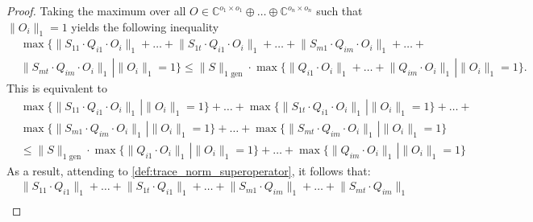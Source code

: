 \begin{proof}
Taking the maximum over all $O \in \mathbb{C}^{o_1 \times o_1} \oplus \ldots \oplus \mathbb{C}^{o_n \times o_n}$ such that $\lVert O_i \rVert_{1} = 1$ yields the following inequality 
\begin{equation}
  \begin{split}
  & \max \{ \lVert S_{11} \cdot Q_{i1} \cdot O_{i} \rVert_{1} + \ldots + \lVert S_{1t} \cdot Q_{i1} \cdot O_{i} \rVert_{1} + \ldots + \lVert S_{m1} \cdot Q_{im} \cdot O_{i} \rVert_{1} + \ldots +  \\
  &  \lVert S_{mt} \cdot Q_{im}  \cdot O_{i} \rVert_{1} \hspace{1pt} |\lVert O_i \rVert_{1} = 1 \} \leq  \lVert S  \rVert_{1 \text{ gen}} \cdot \max \{ \lVert Q_{i1} \cdot O_{i} \rVert_{1} + \ldots + \lVert Q_{im} \cdot O_{i} \rVert_{1} \hspace{1pt} |\lVert O_i \rVert_{1} = 1 \}.
  \end{split}
\end{equation}
This is equivalent to
\begin{equation}
  \begin{split}
  & \max \{ \lVert S_{11} \cdot Q_{i1} \cdot O_{i} \rVert_{1} \hspace{1pt}|\lVert O_i \rVert_{1} = 1 \} + \ldots + \max \{\lVert S_{1t} \cdot Q_{i1} \cdot O_{i} \rVert_{1}  \hspace{1pt}|\lVert O_i \rVert_{1} = 1 \}  + \ldots +   \\
  & \max \{\lVert S_{m1} \cdot Q_{im} \cdot O_{i} \rVert_{1} \hspace{1pt}|\lVert O_i \rVert_{1} = 1 \} + \ldots + \max \{ \lVert S_{mt} \cdot Q_{im}  \cdot O_{i} \rVert_{1} \hspace{1pt} |\lVert O_i \rVert_{1} = 1 \}  \\
  & \leq  \lVert S  \rVert_{1 \text{ gen}} \cdot \max \{ \lVert Q_{i1} \cdot O_{i} \rVert_{1}  \hspace{1pt} |\lVert O_i \rVert_{1} = 1 \}  + \ldots + \max \{\lVert Q_{im} \cdot O_{i} \rVert_{1} \hspace{1pt} |\lVert O_i \rVert_{1} = 1 \} 
  \end{split}
\end{equation}
As a result, attending to \autoref{def:trace_norm_superoperator}, it follows that:
\begin{equation}
  \begin{split}
  & \lVert S_{11} \cdot Q_{i1} \rVert_{1} + \ldots + \lVert S_{1t} \cdot Q_{i1} \rVert_{1} + \ldots + \lVert S_{m1} \cdot Q_{im} \rVert_{1} + \ldots +  \lVert S_{mt} \cdot Q_{im} \rVert_{1} \\

\end{split}
\end{equation}
\end{proof}
